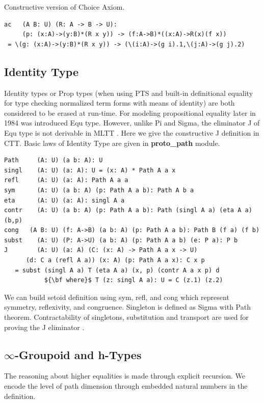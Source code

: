 \documentclass{article}
\begin{document}
Constructive version of Choice Axiom.

\begin{lstlisting}[mathescape=true]
ac   (A B: U) (R: A -> B -> U):
     (p: (x:A)->(y:B)*(R x y)) -> (f:A->B)*((x:A)->R(x)(f x))
 = \(g: (x:A)->(y:B)*(R x y)) -> (\(i:A)->(g i).1,\(j:A)->(g j).2)
\end{lstlisting}

\subsection{Identity Type}

Identity types or Prop types (when using PTS and built-in definitional equality for type checking
normalized term forms with means of identity) are both considered to be erased at run-time.
For modeling propositional equality later in 1984 was introduced Equ type. \cite{Lof84}
However, unlike Pi and Sigma, the eliminator J of Equ type is
not derivable in MLTT \cite{Hofmann96, Mortberg17, HoTT}.
Here we give the constructive J definition in CTT. Basic laws of Identity Type
are given in {\bf proto\_path} module.

\begin{lstlisting}[mathescape=true]
Path     (A: U) (a b: A): U
singl    (A: U) (a: A): U = (x: A) * Path A a x
refl     (A: U) (a: A): Path A a a
sym      (A: U) (a b: A) (p: Path A a b): Path A b a
eta      (A: U) (a: A): singl A a
contr    (A: U) (a b: A) (p: Path A a b): Path (singl A a) (eta A a) (b,p)
cong   (A B: U) (f: A->B) (a b: A) (p: Path A a b): Path B (f a) (f b)
subst    (A: U) (P: A->U) (a b: A) (p: Path A a b) (e: P a): P b
J        (A: U) (a: A) (C: (x: A) -> Path A a x -> U)
      (d: C a (refl A a)) (x: A) (p: Path A a x): C x p
   = subst (singl A a) T (eta A a) (x, p) (contr A a x p) d
           ${\bf where}$ T (z: singl A a): U = C (z.1) (z.2)
\end{lstlisting}

We can build setoid \cite{Bishop67} definition using sym, refl, and cong which
represent symmetry, reflexivity, and congruence.
Singleton is defined as Sigma with Path theorem. Contractability of singletons,
substitution and transport are used for proving the J eliminator \cite{HoTT}.

\subsection{$\infty$-Groupoid and h-Types}

The reasoning about higher equalities is made through explicit recursion.
We encode the level of path dimension through embedded natural numbers in the definition.
\end{document}
